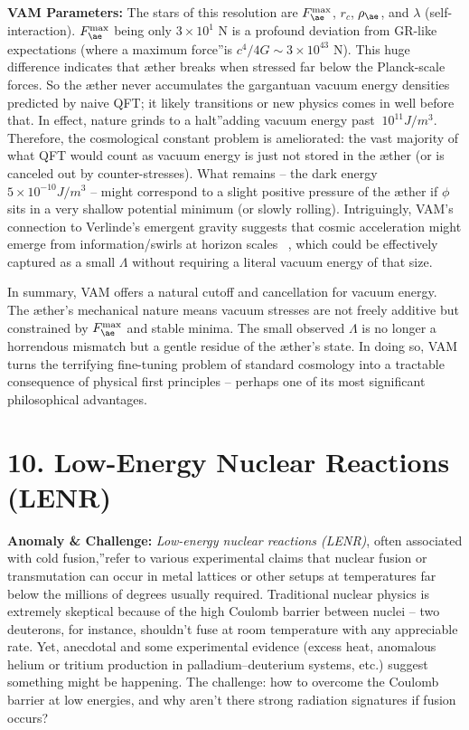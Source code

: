 \documentclass[a4paper, aps,preprint,superscriptaddress, 12pt]{revtex4}
\begin{document}
\textbf{VAM Parameters:} The stars of this resolution are $F_{\ae}^{\max}$, $r_c$, $\rho_{\ae}$, and $\lambda$ (self-interaction). $F_{\ae}^{\max}$ being only $3\times10^1$ N is a profound deviation from GR-like expectations (where a \grqq maximum force\textquotedblright is $c^4/4G \sim 3\times10^{43}$ N). This huge difference indicates that æther breaks when stressed far below the Planck-scale forces. So the æther never accumulates the gargantuan vacuum energy densities predicted by naive QFT; it likely transitions or new physics comes in well before that. In effect, nature \grqq grinds to a halt\textquotedblright adding vacuum energy past $~10^11 J/m^3$. Therefore, the cosmological constant problem is ameliorated: the vast majority of what QFT would count as vacuum energy is just not stored in the æther (or is canceled out by counter-stresses). What remains – the dark energy ~ $5\times10^{-10} J/m^3$ – might correspond to a slight positive pressure of the æther if $\phi$ sits in a very shallow potential minimum (or slowly rolling). Intriguingly, VAM's connection to Verlinde's emergent gravity suggests that cosmic acceleration might emerge from information/swirls at horizon scales~\cite{Iskandarani2025c} , which could be effectively captured as a small $\Lambda$ without requiring a literal vacuum energy of that size.


In summary, VAM offers a natural cutoff and cancellation for vacuum energy. The æther's mechanical nature means vacuum stresses are not freely additive but constrained by $F_{\ae}^{\max}$ and stable minima. The small observed $\Lambda$ is no longer a horrendous mismatch but a gentle residue of the æther's state. In doing so, VAM turns the terrifying fine-tuning problem of standard cosmology into a tractable consequence of physical first principles – perhaps one of its most significant philosophical advantages.


\section*{10. Low-Energy Nuclear Reactions (LENR)}

\textbf{Anomaly \& Challenge: } \textit{Low-energy nuclear reactions (LENR)}, often associated with \grqq cold fusion,\textquotedblright refer to various experimental claims that nuclear fusion or transmutation can occur in metal lattices or other setups at temperatures far below the millions of degrees usually required. Traditional nuclear physics is extremely skeptical because of the high Coulomb barrier between nuclei – two deuterons, for instance, shouldn't fuse at room temperature with any appreciable rate. Yet, anecdotal and some experimental evidence (excess heat, anomalous helium or tritium production in palladium–deuterium systems, etc.) suggest something might be happening. The challenge: how to overcome the Coulomb barrier at low energies, and why aren't there strong radiation signatures if fusion occurs?
\end{document}
